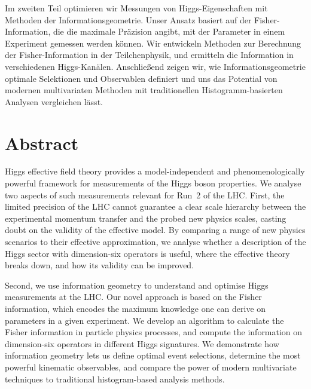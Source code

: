 Im zweiten Teil optimieren wir Messungen von Higgs-Eigenschaften mit
Methoden der Informationsgeometrie. Unser Ansatz basiert auf der
Fisher-Information, die die maximale Pr\"azision angibt, mit der
Parameter in einem Experiment gemessen werden k\"onnen. Wir entwickeln
Methoden zur Berechnung der Fisher-Information in der Teilchenphysik,
und ermitteln die Information in verschiedenen
Higgs-Kan\"alen. Anschlie\ss{}end zeigen wir, wie
Informationsgeometrie optimale Selektionen und Observablen definiert
und uns das Potential von modernen multivariaten Methoden mit
traditionellen Histogramm-basierten Analysen vergleichen l\"asst.



\chapter*{Abstract}


Higgs effective field theory provides a model-independent and
phenomenologically powerful framework for measurements of the Higgs
boson properties. We analyse two aspects of such measurements relevant
for Run~2 of the LHC. First, the limited precision of the LHC cannot
guarantee a clear scale hierarchy between the experimental momentum
transfer and the probed new physics scales, casting doubt on the
validity of the effective model. By comparing a range of new physics
scenarios to their effective approximation, we analyse whether a
description of the Higgs sector with dimension-six operators is
useful, where the effective theory breaks down, and how its validity
can be improved.

Second, we use information geometry to understand and optimise Higgs
measurements at the LHC. Our novel approach is based on the Fisher
information, which encodes the maximum knowledge one can derive on
parameters in a given experiment. We develop an algorithm to calculate
the Fisher information in particle physics processes, and compute the
information on dimension-six operators in different Higgs signatures.
We demonstrate how information geometry lets us define optimal event
selections, determine the most powerful kinematic observables, and
compare the power of modern multivariate techniques to traditional
histogram-based analysis methods.
